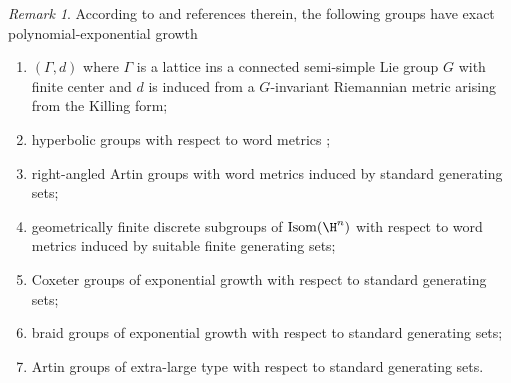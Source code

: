 \documentclass[12pt]{article}
\theoremstyle{plain}
\newtheorem{prop}[thm]{Proposition}
\theoremstyle{definition}
\newtheorem{defn}{Definition}
\theoremstyle{remark}
\newtheorem{remark}{Remark}
\newcommand{\G}{\Gamma}
\renewcommand\a{\alpha}
\begin{document}
\begin{remark}
    According to \cite{fujiwara2025hardylittlewoodmaximaloperatorspaces} and references therein, the following groups have exact polynomial-exponential growth %
        \begin{enumerate}
        \item $(\G,d)$ where $\G$ is a lattice ins a connected semi-simple Lie group $G$ with finite center and $d$ is induced from a $G$-invariant Riemannian metric arising from the Killing form;
        \item hyperbolic groups with respect to word metrics \cite{MR1214072};
        \item right-angled Artin groups with word metrics induced by standard generating sets;
        \item geometrically finite discrete subgroups of $\operatorname{Isom}(\H^n)$ with respect to word metrics induced by suitable finite generating sets;
        \item Coxeter groups of exponential growth with respect to standard generating sets;
        \item braid groups of exponential growth with respect to standard generating sets;
        \item Artin groups of extra-large type with respect to standard generating sets.
    \end{enumerate}
\end{remark}





\end{document}
